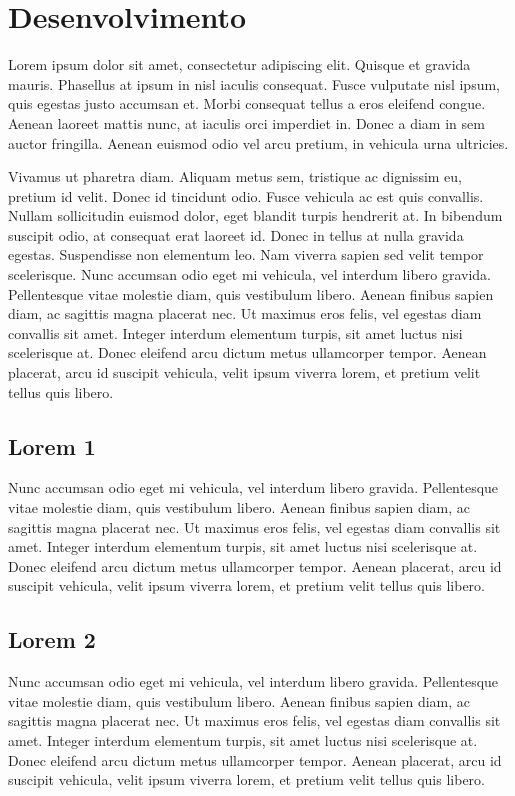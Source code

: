 \documentclass[a4paper, 12pt, openright, oneside]{article}
\begin{document}
\newpage

\section{Desenvolvimento}

Lorem ipsum dolor sit amet, consectetur adipiscing elit. Quisque et gravida mauris. Phasellus at ipsum in nisl iaculis consequat. Fusce vulputate nisl ipsum, quis egestas justo accumsan et. Morbi consequat tellus a eros eleifend congue. Aenean laoreet mattis nunc, at iaculis orci imperdiet in. Donec a diam in sem auctor fringilla. Aenean euismod odio vel arcu pretium, in vehicula urna ultricies.

Vivamus ut pharetra diam. Aliquam metus sem, tristique ac dignissim eu, pretium id velit. Donec id tincidunt odio. Fusce vehicula ac est quis convallis. Nullam sollicitudin euismod dolor, eget blandit turpis hendrerit at. In bibendum suscipit odio, at consequat erat laoreet id. Donec in tellus at nulla gravida egestas. Suspendisse non elementum leo. Nam viverra sapien sed velit tempor scelerisque. Nunc accumsan odio eget mi vehicula, vel interdum libero gravida. Pellentesque vitae molestie diam, quis vestibulum libero. Aenean finibus sapien diam, ac sagittis magna placerat nec. Ut maximus eros felis, vel egestas diam convallis sit amet. Integer interdum elementum turpis, sit amet luctus nisi scelerisque at. Donec eleifend arcu dictum metus ullamcorper tempor. Aenean placerat, arcu id suscipit vehicula, velit ipsum viverra lorem, et pretium velit tellus quis libero.

\subsection{Lorem 1}
Nunc accumsan odio eget mi vehicula, vel interdum libero gravida. Pellentesque vitae molestie diam, quis vestibulum libero. Aenean finibus sapien diam, ac sagittis magna placerat nec. Ut maximus eros felis, vel egestas diam convallis sit amet. Integer interdum elementum turpis, sit amet luctus nisi scelerisque at. Donec eleifend arcu dictum metus ullamcorper tempor. Aenean placerat, arcu id suscipit vehicula, velit ipsum viverra lorem, et pretium velit tellus quis libero.

\subsection{Lorem 2}
Nunc accumsan odio eget mi vehicula, vel interdum libero gravida. Pellentesque vitae molestie diam, quis vestibulum libero. Aenean finibus sapien diam, ac sagittis magna placerat nec. Ut maximus eros felis, vel egestas diam convallis sit amet. Integer interdum elementum turpis, sit amet luctus nisi scelerisque at. Donec eleifend arcu dictum metus ullamcorper tempor. Aenean placerat, arcu id suscipit vehicula, velit ipsum viverra lorem, et pretium velit tellus quis libero.
\end{document}
